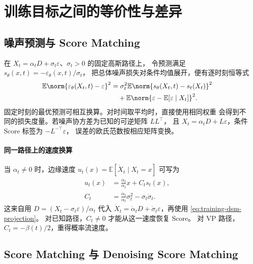 \section{训练目标之间的等价性与差异}
\label{sec:training-equivalence}

\subsection{噪声预测与 Score Matching}

在 \(X_t=\alpha_tD+\sigma_t\varepsilon\)、\(\sigma_t>0\) 的固定高斯路径上，
令预测满足 \(s_\theta(x,t)=-\varepsilon_\theta(x,t)/\sigma_t\)，
把总体噪声损失对条件均值展开，便有逐时刻恒等式
\begin{equation}
  \begin{aligned}
  \mathbb E\norm{\varepsilon_\theta(X_t,t)-\varepsilon}^2
   &=\sigma_t^2\mathbb E\norm{s_\theta(X_t,t)-s_t(X_t)}^2\\
   &\quad+\mathbb E\norm{\varepsilon-\mathbb E[\varepsilon\mid X_t]}^2 .
  \end{aligned}
  \label{eq:training-eps-score}
\end{equation}
固定时刻的最优预测可相互换算。对时间取平均时，直接使用相同权重
会得到不同的损失度量。若噪声协方差为已知的可逆矩阵 \(LL^\top\)，
且 \(X_t=\alpha_tD+L\varepsilon\)，条件 Score 标签为 \(-L^{-\top}\varepsilon\)，
误差的欧氏范数按相应矩阵变换。

\paragraph{同一路径上的速度换算}
当 \(\alpha_t\ne0\) 时，边缘速度 \(u_t(x)=\mathbb E[\dot X_t\mid X_t=x]\) 可写为
\begin{equation}
  \begin{aligned}
  u_t(x)&=\frac{\dot\alpha_t}{\alpha_t}x+C_t s_t(x),\\
  C_t&=\frac{\dot\alpha_t}{\alpha_t}\sigma_t^2-\sigma_t\dot\sigma_t .
  \end{aligned}
  \label{eq:training-velocity-score}
\end{equation}
这来自用 \(D=(X_t-\sigma_t\varepsilon)/\alpha_t\) 代入
\(\dot X_t=\dot\alpha_tD+\dot\sigma_t\varepsilon\)，再使用 \eqref{eq:training-dsm-projection}。
对已知路径，\(C_t\ne0\) 才能从这一速度恢复 Score。
对 VP 路径，\(C_t=-\beta(t)/2\)，重得概率流速度。

\subsection{Score Matching 与 Denoising Score Matching}

